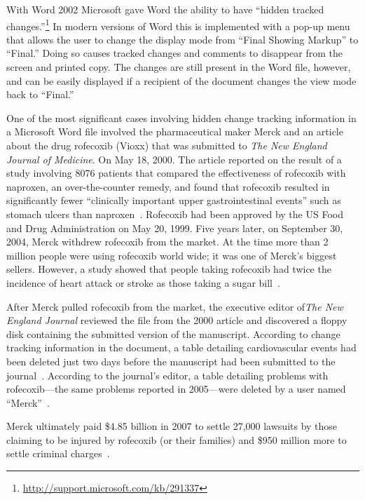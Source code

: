 With Word 2002 Microsoft gave Word the ability to have ``hidden
tracked
changes.''\footnote{\url{http://support.microsoft.com/kb/291337}} In
modern versions of Word this is implemented with a pop-up menu that
allows the user to change the display mode from ``Final Showing
Markup'' to ``Final.'' Doing so causes tracked changes and comments to
disappear from the screen and printed copy. The changes are still
present in the Word file, however, and can be easily displayed if a
recipient of the document  changes the view mode back to ``Final.''

One of the most significant cases involving hidden change tracking
information in a Microsoft Word file involved the pharmaceutical maker Merck and
an article about the drug rofecoxib (Vioxx) that was submitted to
\emph{The New England Journal of Medicine}. On May 18, 2000. The
article reported on the result of a study involving 8076 patients that
compared the effectiveness of rofecoxib with naproxen, an
over-the-counter remedy, and found that rofecoxib resulted in
significantly fewer ``clinically important upper gastrointestinal
events'' such as stomach ulcers than
naproxen~\cite{bombardier-2000}. Rofecoxib had been approved by the US
Food and Drug Administration on May 20, 1999. Five years later, on
September 30, 2004, Merck withdrew rofecoxib from the market. At the
time more than 2 million people were using rofecoxib world wide; it was
one of Merck's biggest sellers. However, a study showed that people
taking rofecoxib had twice the incidence of heart attack or stroke as
those taking a sugar bill~\cite{npr-vioxx}.

After Merck pulled rofecoxib from the market, the executive editor
of\emph{The New England Journal} reviewed the file from the 2000
article and discovered a floppy disk containing the submitted version
of the manuscript. According to change tracking information in the
document, a table detailing cardiovascular events had been deleted
just two days before the manuscript had been submitted to the
journal~\cite{nejm-concern}. According to the journal's editor, a
table detailing problems with rofecoxib---the same problems reported
in 2005---were deleted by a user named
``Merck''~\cite{forbes-mercks-deleted-data}.

Merck ultimately paid \$4.85 billion in 2007 to settle 27,000 lawsuits
by those claiming to be injured by rofecoxib (or their families) and
 \$950 million more to settle criminal charges~\cite{nyt-vioxx-settlement}. 

